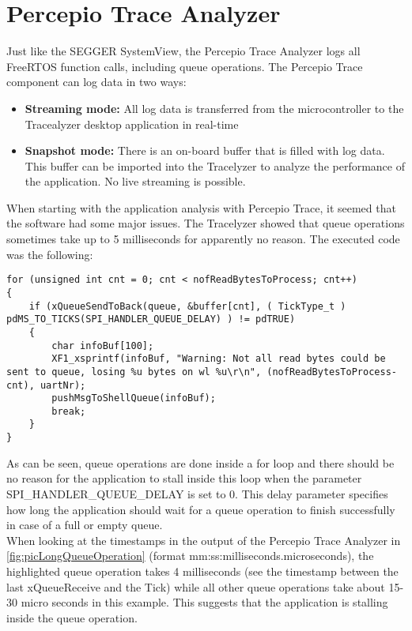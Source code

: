 \section{Percepio Trace Analyzer} \label{sec:SystemAnalysis}
Just like the SEGGER SystemView, the Percepio Trace Analyzer logs all FreeRTOS function calls, including queue operations. 
The Percepio Trace component can log data in two ways:
\begin{itemize}
    \item \textbf{Streaming mode:} All log data is transferred from the microcontroller to the Tracealyzer desktop application in real-time
    \item \textbf{Snapshot mode:} There is an on-board buffer that is filled with log data. This buffer can be imported into the Tracelyzer to analyze the performance of the application. No live streaming is possible.
\end{itemize}
When starting with the application analysis with Percepio Trace, it seemed that the software had some major issues. The Tracelyzer showed that queue operations sometimes take up to 5 milliseconds for apparently no reason. The executed code was the following:
\begin{lstlisting}
for (unsigned int cnt = 0; cnt < nofReadBytesToProcess; cnt++)
{
    if (xQueueSendToBack(queue, &buffer[cnt], ( TickType_t ) pdMS_TO_TICKS(SPI_HANDLER_QUEUE_DELAY) ) != pdTRUE)
    {
        char infoBuf[100];
        XF1_xsprintf(infoBuf, "Warning: Not all read bytes could be sent to queue, losing %u bytes on wl %u\r\n", (nofReadBytesToProcess-cnt), uartNr);
        pushMsgToShellQueue(infoBuf);
        break;
    }
}
\end{lstlisting}
%
As can be seen, queue operations are done inside a for loop and there should be no reason for the application to stall inside this loop when the parameter SPI\_HANDLER\_QUEUE\_DELAY is set to 0. This delay parameter specifies how long the application should wait for a queue operation to finish successfully in case of a full or empty queue.\\
When looking at the timestamps in the output of the Percepio Trace Analyzer in \autoref{fig:picLongQueueOperation} (format mm:ss:milliseconds.microseconds), the highlighted queue operation takes 4 milliseconds (see the timestamp between the last xQueueReceive and the Tick) while all other queue operations take about 15-30 micro seconds in this example. This suggests that the application is stalling inside the queue operation.\\
